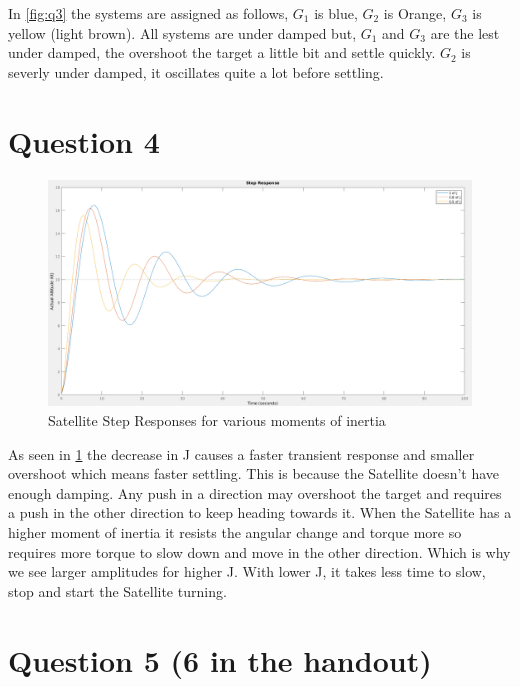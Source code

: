 \documentclass[a4paper, 12pt]{article}
\begin{document}
        In \cref{fig:q3} the systems are assigned as follows, $G_1$ is blue, $G_2$ is Orange, $G_3$ is yellow (light brown). All systems are under damped but, $G_1$ and $G_3$ are the lest under damped, the overshoot the target a little bit and settle quickly. $G_2$ is severly under damped, it oscillates quite a lot before settling. 

    \section{Question 4}

        

        \begin{figure}[!h]
            \centering
            \includegraphics[width=\textwidth]{q4.png}
            \caption{Satellite Step Responses for various moments of inertia}
            \label{fig:q4}
        \end{figure}

        As seen in \cref{fig:q4} the decrease in J causes a faster transient response and smaller overshoot which means faster settling. This is because the Satellite doesn't have enough damping. Any push in a direction may overshoot the target and requires a push in the other direction to keep heading towards it. When the Satellite has a higher moment of inertia it resists the angular change and torque more so requires more torque to slow down and move in the other direction. Which is why we see larger amplitudes for higher J. With lower J, it takes less time to slow, stop and start the Satellite turning.

    \section{Question 5 (6 in the handout)}
\end{document}
